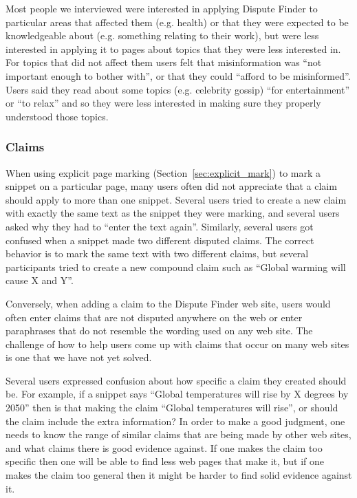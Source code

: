 \documentclass{www2010-submission}
\begin{document}
Most people we interviewed were interested in applying Dispute Finder to particular areas that affected them (e.g. health) or that they were expected to be knowledgeable about (e.g. something relating to their work), but were less interested in applying it to pages about topics that they were less interested in. For topics that did not affect them users felt that misinformation was ``not important enough to bother with'', or that they could ``afford to be misinformed''. Users said they read about some topics (e.g. celebrity gossip) ``for entertainment'' or ``to relax'' and so they were less interested in making sure they properly understood those topics.

%

\subsubsection{Claims}

When using explicit page marking (Section~\ref{sec:explicit_mark}) to mark a snippet on a particular page, many users often did not appreciate that a claim should apply to more than one snippet. Several users tried to create a new claim with exactly the same text as the snippet they were marking, and several users asked why they had to ``enter the text again''. Similarly, several users got confused when a snippet made two different disputed claims. The correct behavior is to mark the same text with two different claims, but several participants tried to create a new compound claim such as ``Global warming will cause X and Y''. 

Conversely, when adding a claim to the Dispute Finder web site, users would often enter claims that are not disputed anywhere on the web or enter paraphrases that do not resemble the wording used on any web site. The challenge of how to help users come up with claims that occur on many web sites is one that we have not yet solved.

Several users expressed confusion about how specific a claim they created should be. For example, if a snippet says ``Global temperatures will rise by X degrees by 2050'' then is that making the claim ``Global temperatures will rise'', or should the claim include the extra information? In order to make a good judgment, one needs to know the range of similar claims that are being made by other web sites, and what claims there is good evidence against. If one makes the claim too specific then one will be able to find less web pages that make it, but if one makes the claim too general then it might be harder to find solid evidence against it.
\end{document}
